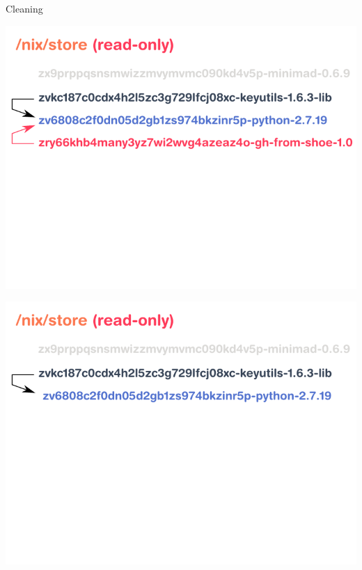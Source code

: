 \documentclass[aspectratio=169]{beamer}
\begin{document}
\begin{frame}{Cleaning}
     {
        \begin{center}
            \includegraphics[height=0.98\textheight]{img/schema-nix-store-cleaning-1.pdf}
        \end{center}
    }
     {
        \begin{center}
            \includegraphics[height=0.98\textheight]{img/schema-nix-store-cleaning-2.pdf}
        \end{center}
    }
     {
        \begin{center}

\end{center}}
\end{frame}
\end{document}
